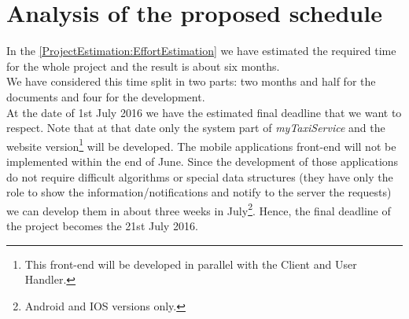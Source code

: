 \documentclass[\mainpath/main]{subfiles}
\begin{document}
\section{Analysis of the proposed schedule}
In the \autoref{ProjectEstimation:EffortEstimation} we have estimated the required time for the whole project and the result is about six months.\\ 
We have considered this time split in two parts: two months and half for the documents and four for the development.\\
At the date of 1st July 2016 we have the estimated final deadline that we want to respect. Note that at that date only the system part of \textit{myTaxiService} and the website version\footnote{This front-end will be developed in parallel with the Client and User Handler.} will be developed. The mobile applications front-end will not be implemented within the end of June. Since the development of those applications do not require difficult algorithms or special data structures (they have only the role to show the information/notifications and notify to the server the requests) we can develop them in about three weeks in July\footnote{Android and IOS versions only.}. Hence, the final deadline of the project becomes the 21st July 2016.
\end{document}
